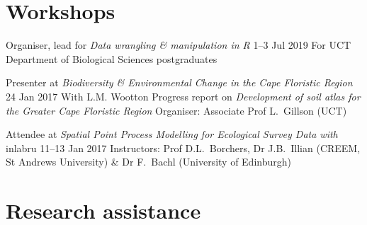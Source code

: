\documentclass[10pt]{article}
\begin{document}
\section*{Workshops} %

\begin{hangparas}{2em}{1}

Organiser, lead for \textit{Data wrangling \& manipulation in R}
                                                     \hfill 1--3 Jul 2019 \break
For UCT Department of Biological Sciences postgraduates

Presenter at \textit{Biodiversity \& Environmental Change in the Cape 
Floristic Region}                                      \hfill 24 Jan 2017 \break
With L.M. Wootton                                                         \break
Progress report on \textit{Development of soil atlas for the 
Greater Cape Floristic Region}                                            \break
Organiser: Associate Prof L.~Gillson (UCT)

Attendee at \textit{Spatial Point Process Modelling for Ecological 
Survey Data with} inlabru                          \hfill 11--13 Jan 2017 \break
Instructors:
  Prof D.L.~Borchers,
  Dr J.B.~Illian (CREEM, St Andrews University)                           \break
  \& Dr F.~Bachl (University of Edinburgh)

\hfill

\end{hangparas}

\section*{Research assistance} %
\end{document}
